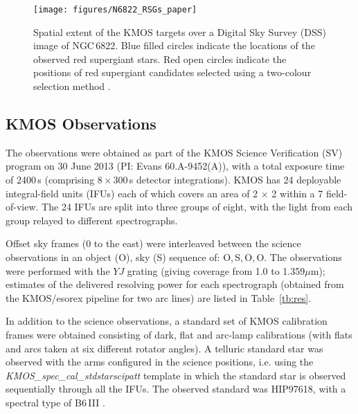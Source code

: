 \documentclass[iop]{emulateapj}
\begin{document}
\begin{figure}
 \texttt{[image: figures/N6822\_RSGs\_paper]}
 \caption{Spatial extent of the KMOS targets over a Digital Sky Survey (DSS) image of NGC\,6822.
          Blue filled circles indicate the locations of the observed red supergiant stars.
          Red open circles indicate the positions of red supergiant candidates selected using a two-colour selection method
          \citep{2012AJ....144....2L}.
          }
 \label{fig:N6822}
\end{figure}


\subsection{KMOS Observations} %
\label{sub:observations}

The observations were obtained as part of the KMOS Science Verification (SV) program on 30 June 2013 (PI: Evans 60.A-9452(A)),
with a total exposure time of 2400\,s
(comprising 8\,$\times$\,300\,s detector integrations).
KMOS has 24 deployable integral-field units (IFUs) each of which covers an area of
2 $\times$ 2 within a 7 field-of-view.
The 24 IFUs are split into three groups of eight, with the light from each group relayed to different spectrographs.

Offset sky frames
(0 to the east) were interleaved between the science observations in an object (O), sky (S) sequence of:
O,\,S,\,O,\,O.
The observations were performed with the $YJ$ grating
(giving coverage from 1.0 to 1.359$\mu$m);
estimates of the delivered resolving power for each spectrograph (obtained from the KMOS/esorex pipeline for two arc lines) are listed in Table~\ref{tb:res}.

In addition to the science observations, a standard set of KMOS calibration frames were obtained consisting of dark, flat and arc-lamp calibrations (with flats and arcs taken at six different rotator angles).
A telluric standard star was observed with the arms configured in the science positions, i.e. using the {\em KMOS\_spec\_cal\_stdstarscipatt} template in which the standard star is observed sequentially through all the IFUs.
The observed standard was HIP97618, with a spectral type of B6\,III
\citep{1988mcts.book.....H}.
\end{document}

